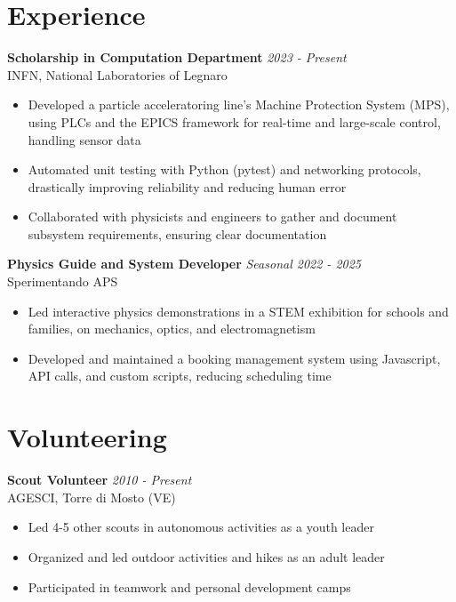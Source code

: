 \documentclass[a4paper,10pt]{article}
\begin{document}
\begin{minipage}[t]{0.58\textwidth}
    \section*{Experience}
        \textbf{Scholarship in Computation Department}  \hfill \textit{2023 - Present} \\
        INFN, National Laboratories of Legnaro
        \vspace{-0.1cm}
        \begin{itemize}[left=0.2cm, label={\textbullet}, itemsep=0cm]
            \item Developed a particle acceleratoring line's Machine Protection System (MPS), using PLCs and the EPICS framework for real-time and large-scale control, handling sensor data
            \item Automated unit testing with Python (pytest) and networking protocols, drastically improving reliability and reducing human error
            \item Collaborated with physicists and engineers to gather and document subsystem requirements, ensuring clear documentation
        \end{itemize}
        \vspace{0.2cm}
        
        \textbf{Physics Guide and System Developer}  \hfill \textit{Seasonal 2022 - 2025} \\
        Sperimentando APS 
        \vspace{-0.1cm}
        \begin{itemize}[left=0.2cm, label={\textbullet}, itemsep=0cm]
            \item Led interactive physics demonstrations in a STEM exhibition for schools and families, on mechanics, optics, and electromagnetism
            \item Developed and maintained a booking management system using Javascript, API calls, and custom scripts, reducing scheduling time
        \end{itemize}

    \section*{Volunteering}
        \textbf{Scout Volunteer} \hfill \textit{2010 - Present} \\
        AGESCI, Torre di Mosto (VE)
        \vspace{-0.1cm}
        \begin{itemize}[left=0.2cm, label={\textbullet}, itemsep=0cm]
            \item Led 4-5 other scouts in autonomous activities as a youth leader
            \item Organized and led outdoor activities and hikes as an adult leader
            \item Participated in teamwork and personal development camps
        \end{itemize}
\end{minipage}

\vfill
\end{document}
